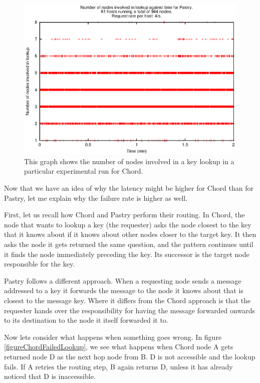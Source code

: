 \begin{figure}[!htbp]
  \begin{center}
    \includegraphics[width=0.9\linewidth]{illustrations/nodes_against_time_pastry.eps}
    \caption{This graph shows the number of nodes involved in a key lookup in a particular experimental run for Chord.}
    \label{figPastryNumNodes}
  \end{center}
\end{figure}

\mbox{}
Now that we have an idea of why the latency might be higher for Chord than for Pastry, let me explain why the failure rate is higher as well.

First, let us recall how Chord and Pastry perform their routing.
In Chord, the node that wants to lookup a key (the requester) asks the node closest to the key that it knows about if it knows about other nodes closer to the target key. It then asks the node it gets returned the same question, and the pattern continues until it finds the node immediately preceding the key. Its successor is the target node responsible for the key.

Pastry follows a different approach. When a requesting node sends a message addressed to a key it forwards the message to the node it knows about that is closest to the message key. Where it differs from the Chord approach is that the requester hands over the responsibility for having the message forwarded onwards to its destination to the node it itself forwarded it to.

Now lets consider what happens when something goes wrong.
In figure \ref{figureChordFailedLookup}, we see what happens when Chord node A gets returned node D as the next hop node from B. D is not accessible and the lookup fails. If A retries the routing step, B again returns D, unless it has already noticed that D is inaccessible.

